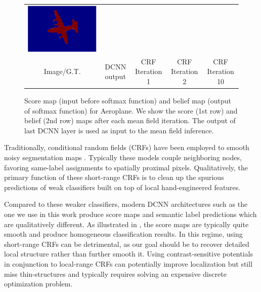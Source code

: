 \begin{figure}[t]
\begin{tabular}{c c c c c}
    \includegraphics[width=0.16\linewidth]{fig/mean_field_illustration/Belief_Class1_Itr10.pdf} \\
    {\tiny Image/G.T.} & {\tiny DCNN output} & {\tiny CRF Iteration 1} & {\tiny CRF Iteration 2} & {\tiny CRF Iteration 10} \\
  \end{tabular}
  \caption{Score map (input before softmax function) and belief map (output of
    softmax function) for Aeroplane. We show the score (1st row) and belief (2nd row)
    maps after each mean field iteration. The output of last DCNN layer is used as
    input to the mean field inference.}
  \label{fig:score-maps}
\end{figure}

Traditionally, conditional random fields (CRFs) have been employed to smooth
noisy segmentation maps \cite{rother2004grabcut, kohli2009robust}. Typically
these models  couple neighboring nodes, favoring
same-label assignments to spatially proximal pixels. Qualitatively, the
primary function of these short-range CRFs is to clean up the spurious
predictions of weak classifiers built on top of local hand-engineered features.

Compared to these weaker classifiers, modern DCNN architectures such as
the one we use in this work produce score maps and semantic label
predictions which are qualitatively different. As illustrated in
, the score maps are typically quite smooth and
produce homogeneous classification results. In this regime, using short-range
CRFs can be detrimental, as our goal should be to recover detailed local
structure rather than further smooth it. Using contrast-sensitive potentials
\cite{rother2004grabcut} in conjunction to local-range CRFs can potentially
improve localization but still miss thin-structures and typically requires
solving an expensive discrete optimization problem.

